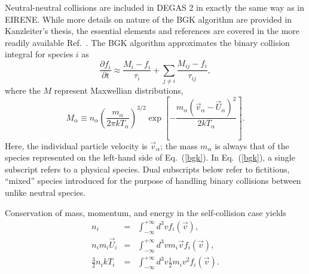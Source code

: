 \documentclass[12pt]{report}
\begin{document}
Neutral-neutral collisions are included in DEGAS 2 in exactly the same
way as in EIRENE. While more details on nature of the BGK algorithm
are provided in Kanzleiter's thesis\cite{Kanz99}, the essential elements
and references are covered in the more readily available Ref.~\cite{Reit97}.
The BGK algorithm approximates the binary collision integral for species $i$ as
\begin{equation}
\frac{\partial f_{i}}{\partial t} \approx \frac{M_{i} - f_{i}}{\tau_{i}}
+ \sum_{j \neq i} \frac{M_{ij} - f_{i}}{\tau_{ij}},
\label{bgk}
\end{equation}
where the $M$ represent Maxwellian distributions,
\begin{equation}
M_{\alpha} \equiv n_{\alpha} \left( \frac{m_{\alpha}}{2 \pi k T_{\alpha}}
\right)^{3/2} \exp \left[ - \frac{m_{\alpha} 
(\vec{v}_{\alpha} - \vec{U}_{\alpha})^{2}}{2 k T_{\alpha}} \right].
\label{bgkMax}
\end{equation}
Here, the individual particle velocity is $\vec{v}_{\alpha}$; the mass
$m_{\alpha}$ is always that of the species represented on the
left-hand side of Eq.~(\ref{bgk}).
In Eq.~(\ref{bgk}), a single subscript refers to a physical species. 
Dual subscripts below refer to fictitious, ``mixed'' species introduced
for the purpose of handling binary collisions between unlike neutral
species. 

Conservation of mass, momentum, and energy in the self-collision case
yields
\begin{eqnarray}
n_{i} & = & \int_{-\infty}^{+\infty} d^{3}v f_{i}(\vec{v}), \\
\label{nmoment}
n_{i} m_{i} \vec{U}_{i} & = & \int_{-\infty}^{+\infty} d^{3}v m_{i} 
\vec{v} f_{i}(\vec{v}), \\
\label{vmoment}
\frac{3}{2} n_{i} k T_{i} & = & \int_{-\infty}^{+\infty} d^{3}v 
\frac{1}{2} m_{i} v^{2} f_{i}(\vec{v}).
\label{tmoment}
\end{eqnarray}
\end{document}
